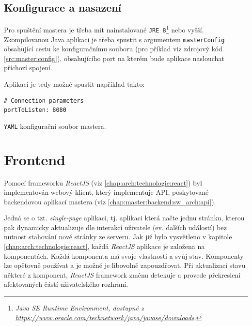 \subsection{Konfigurace a nasazení}
Pro spuštění mastera je třeba mít nainstalované \texttt{JRE 8}\footnote{\textit{Java SE Runtime Environment, dostupné z\\\url{https://www.oracle.com/technetwork/java/javase/downloads}}.} nebo vyšší.
Zkompilovanou Java aplikaci je třeba spustit s argumentem \texttt{masterConfig} obsahující cestu ke konfiguračnímu souboru (pro příklad viz zdrojový kód \ref{src:master:config}), obsahujícího port na kterém bude aplikace naslouchat příchozí spojení.

Aplikaci je tedy možné spustit například takto: 

\begin{code}[h]
  \begin{verbatim}
# Connection parameters
portToListen: 8080
\end{verbatim}
\caption{\texttt{YAML} konfigurační soubor mastera.}
\label{src:master:config}
\end{code}

\section{Frontend}\label{chap:master:frontend}
Pomocí frameworku \textit{ReactJS} (viz \ref{chap:arch:technologie:react}) byl implementován webový klient, který implementuje API, poskytované backendovou aplikací mastera (viz \ref{chap:master:backend:sw_arch:api}). 

Jedná se o tzt. \textit{single-page} aplikaci, tj. aplikaci která načte jednu stránku, kterou pak dynamicky aktualizuje dle interakcí uživatele (ev. dalších událostí) bez nutnost stahování nové stránky ze serveru. Jak již bylo vysvětleno v kapitole \ref{chap:arch:technologie:react}, každá \textit{ReactJS} aplikace je založena na komponentách. Každá komponenta má svoje vlastnosti a svůj stav. Komponenty lze opětovně používat a je možné je libovolně zapouzdřovat. Při aktualizaci stavu některé z komponent, \textit{ReactJS} framework změnu detekuje a provede překreslení afektovaných částí uživatelského rozhraní.

